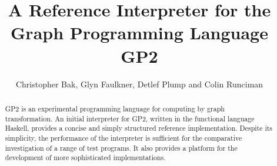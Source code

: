 \documentclass{llncs}
\begin{document}
\title{A Reference Interpreter for the Graph Programming Language GP2}

\author{Christopher Bak, Glyn Faulkner, Detlef Plump and Colin Runciman} 


\maketitle
\thispagestyle{empty}


\begin{abstract}
GP2 is an experimental programming language
for computing by graph transformation.
An initial interpreter for GP2, written
in the functional language Haskell, provides
a concise and simply structured reference
implementation.
Despite its simplicity, the performance of
the interpreter is sufficient for the
comparative investigation of a range of test
programs.
It also provides a platform for the development
of more sophisticated implementations.
\end{abstract}









{}

\end{document}
